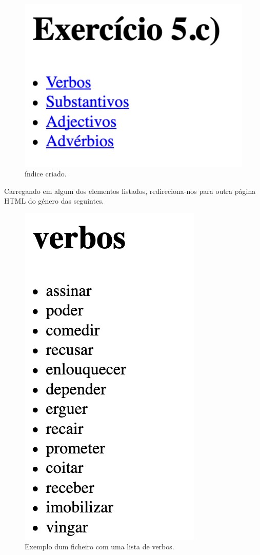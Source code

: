 \documentclass[11pt,a4paper]{report}
\begin{document}
\begin{figure}[H]
\centering
\includegraphics[scale=0.6]{index.png}
\caption{índice criado.}
\label{img:index}
\end{figure}

Carregando em algum dos elementos listados, redireciona-nos para outra página HTML do género das seguintes.

\begin{figure}[H]
\centering
\includegraphics[scale=0.6]{verbos.png}
\caption{Exemplo dum ficheiro com uma lista de verbos.}
\label{img:verbos}
\end{figure}
\end{document}
